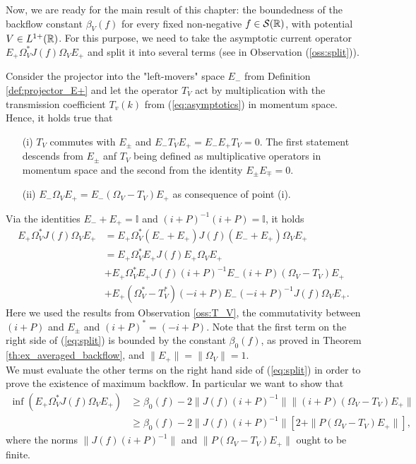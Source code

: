 Now, we are ready for the main result of this chapter: the boundedness of the backflow constant $\beta_V(f)$ for every fixed non-negative $f\in\mathcal{S}({\mathbb R})$, with potential $V\in L^{1+}({\mathbb R})$. For this purpose, we need to take the asymptotic current operator $E_+\Omega_V^*J(f)\Omega_VE_+$ and split it into several terms (see in Observation (\ref{oss:split})).
\begin{oss}
	\label{oss:T_V}
	Consider the projector into the "left-movers" space $E_-$ from Definition \ref{def:projector_E+} and let the operator $T_V$ act by multiplication with the transmission coefficient $T_v(k)$ from (\ref{eq:asymptotics}) in momentum space. Hence, it holds true that
	\begin{itemize}
		\item[(i)]$T_V$ commutes with $E_\pm$ and $E_-T_VE_+=E_-E_+T_V=0$. The first statement descends from $E_\pm$ anf $T_V$ being defined as multiplicative operators in momentum space and the second from the identity $E_\pm E_\mp=0$.
		\item[(ii)]$E_-\Omega_VE_+=E_-(\Omega_V-T_V)E_+$ as consequence of point (i).
	\end{itemize}
\end{oss}

\begin{oss}
	\label{oss:split}
	Via the identities $E_-+E_+=\mathbb{I}$ and $(i+P)^{-1}(i+P)=\mathbb{I}$, it holds
	\begin{equation}
	\label{eq:split}
	\begin{aligned}
	E_+\Omega_V^*J(f)\Omega_VE_+&=E_+\Omega_V^*(E_-+E_+) J(f)(E_-+E_+)\Omega_VE_+\\
	& =E_+\Omega_V^*E_+ J(f)E_+\Omega_VE_+\\
	&+ E_+\Omega_V^*E_+J(f)(i+P)^{-1}E_-(i+P)(\Omega_V-T_V)E_+\\
	&+ E_+(\Omega_V^*-T_V^*)(-i+P)E_-(-i+P)^{-1}J(f)\Omega_VE_+.
	\end{aligned}
	\end{equation}
	Here we used the results from Observation \ref{oss:T_V}, the commutativity between $(i+P)$ and $E_\pm$ and $(i+P)^*=(-i+P)$. Note that the first term on the right side of (\ref{eq:split}) is bounded by the constant $\beta_0(f)$, as proved in Theorem \ref{th:ex_averaged_backflow}, and $\|E_+\|=\|\Omega_V\|=1$.\\
	We must evaluate the other terms on the right hand side of (\ref{eq:split}) in order to prove the existence of maximum backflow. In particular we want to show that
	\begin{equation}
	\begin{aligned}
	\inf(E_+\Omega_V^*J(f)\Omega_VE_+)&\ge \beta_0(f) -2\|J(f)(i+P)^{-1}\|\|(i+P)(\Omega_V-T_V)E_+\|\\ &\ge \beta_0(f)-2\|J(f)(i+P)^{-1}\|[2+\|P(\Omega_V-T_V)E_+\|],
	\end{aligned}
	\label{eq:split2}
	\end{equation}
	where the norms $\|J(f)(i+P)^{-1}\|$ and $\|P(\Omega_V-T_V)E_+\|$ ought to be finite.
\end{oss}

